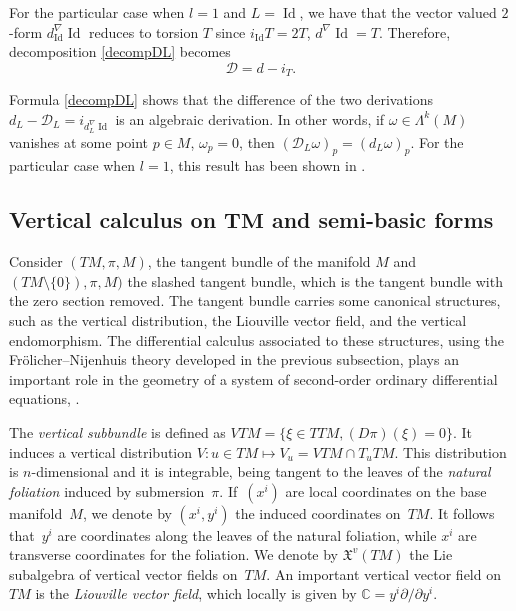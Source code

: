 \documentclass[11pt]{article}
\numberwithin{equation}{section}
\begin{document}
For the particular case when $l=1$ and $L=\operatorname{Id}$, we have that
the vector valued $2$-form
$d_{\operatorname{Id}}^{\nabla}\operatorname{Id}$ reduces to
torsion $T$ since $i_{\operatorname{Id}}T=2T$,
$d^{\nabla}\operatorname{Id}=T$. Therefore, decomposition
\eqref{decompDL} becomes
\[ %
{\mathcal D}=d- i_T.
\]
\begin{Remark}
Formula \eqref{decompDL} shows that the dif\/ference of the two
derivations $d_L-{\mathcal
D}_L=i_{d^{\nabla}_L\operatorname{Id}}$ is an algebraic derivation.
In other words, if $\omega \in \Lambda^k(M)$ vanishes at some
point $p\in M$, $\omega_p=0$, then $({\mathcal
D}_L\omega)_p=(d_L\omega)_p$. For the particular case when $l=1$, this result has been
shown in \cite[Proposition~2.5]{grifone00}.
\end{Remark}



\subsection[Vertical calculus on $TM$ and semi-basic forms]{Vertical calculus on $\boldsymbol{TM}$ and semi-basic forms} \label{subsec:vcalc}

Consider $(TM, \pi, M)$, the tangent bundle of the manifold $M$
and $(TM\setminus\{0\}), \pi, M)$ the slashed tangent bundle, which is
the tangent bundle with the zero
section removed. The tangent bundle carries some canonical structures, such
as the vertical distribution, the Liouville vector f\/ield, and the
vertical endomorphism. The dif\/ferential calculus associated to
these structures, using the Fr\"olicher--Nijenhuis theory developed in
the previous subsection, plays an important role in the geometry of a
system of second-order ordinary dif\/ferential equations,
\cite{ bcd10, bucataru09, grifone72, grifone00, klein68, deleon89, miron94}.

The \emph{vertical subbundle} is def\/ined as $VTM=\{\xi \in TTM,
(D\pi)(\xi)=0\}$. It induces a vertical distribution $V: u\in TM
\mapsto V_u=VTM\cap T_uTM$. This distribution is $n$-dimensional
and it is integrable, being tangent to the leaves of the \emph{natural
foliation} induced by submersion~$\pi$. If~$(x^i)$ are local coordinates on the base
manifold~$M$, we denote by $(x^i, y^i)$ the induced coordinates on~$TM$. It follows that~$y^i$ are coordinates along the leaves of the
natural foliation, while $x^i$ are transverse coordinates for the
foliation. We denote by ${\mathfrak X}^v(TM)$ the Lie subalgebra of vertical vector f\/ields on~$TM$. An
important vertical vector f\/ield on $TM$ is the \emph{Liouville vector
field}, which locally is given by
$\mathbb{C}=y^i{\partial}/{\partial y^i}.$
\end{document}
